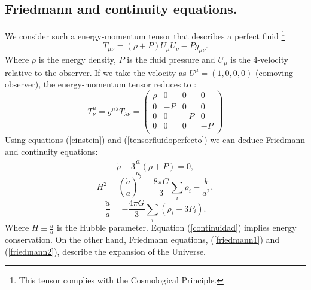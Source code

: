 \documentclass[onecolumn,           %
               showpacs,            %
               preprintnumbers,     %
               aps,                 %
               letterpaper,             %
               superscriptaddress,      %
               nofootinbib,         %
               tightenlines,        %
               floats,floatfix      %
               ,usenatbib,
               ]{revtex4-1}
\begin{document}
\subsection{Friedmann and continuity equations.}
We consider such a energy-momentum tensor that describes a perfect fluid \footnote{This tensor complies with the Cosmological Principle.} \cite{cambridge}
\begin{equation}
\label{tensorfluidoperfecto}
T_{\mu \nu} = (\rho + P)U_{\mu}U_{\nu} - Pg_{\mu \nu} .
\end{equation} 
Where $\rho$ is the energy density, $P$ is the fluid pressure and $U_{\mu}$ is the 4-velocity relative to the observer. If we take the velocity as $U^{\mu} = \left(1,0,0,0\right)$ (comoving observer), the energy-momentum tensor reduces to \cite{cambridge}:
\begin{equation}
T^{\mu}_{\nu} = g^{\mu \lambda} T_{\lambda \nu} = \begin{pmatrix}
\rho & 0 & 0 & 0 \\
0 & -P & 0 & 0 \\
0 & 0 & -P & 0 \\
0 & 0 & 0 & -P \\
\end{pmatrix} 
\end{equation}
Using equations (\ref{einstein}) and (\ref{tensorfluidoperfecto}) we can deduce Friedmann and continuity equations:
\begin{equation}
\label{continuidad}
\dot{\rho} + 3 \frac{\dot{a}}{a} \left(\rho + P\right) = 0,
\end{equation}
\begin{equation}
\label{friedmann1}
H^2 = \left(\frac{\dot{a}}{a}\right)^2 = \frac{8 \pi G}{3} \sum_{i}\rho_{i} - \frac{k}{a^2} ,
\end{equation}
\begin{equation}
\label{friedmann2}
\frac{\ddot{a}}{a} = -\frac{4 \pi G}{3} \sum_{i}\left(\rho_i + 3P_i\right) .
\end{equation}
Where $H \equiv \frac{\dot{a}}{a}$ is the Hubble parameter. Equation (\ref{continuidad}) implies energy conservation. On the other hand, Friedmann equations, (\ref{friedmann1}) and (\ref{friedmann2}), describe the expansion of the Universe. 
\end{document}
